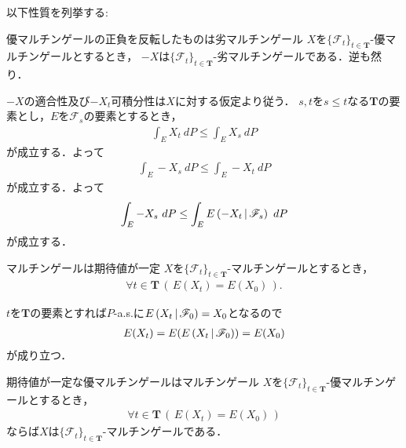 	以下性質を列挙する:
	\begin{itembox}[l]{優マルチンゲールの正負を反転したものは劣マルチンゲール}
		$X$を$\{\mathscr{F}_t\}_{t \in \mathbf{T}}$-優マルチンゲールとするとき，
		$-X$は$\{\mathscr{F}_t\}_{t \in \mathbf{T}}$-劣マルチンゲールである．逆も然り．
	\end{itembox}
	
	\begin{prf}
		$-X$の適合性及び$-X_t$可積分性は$X$に対する仮定より従う．
		$s,t$を$s \leq t$なる$\mathbf{T}$の要素とし，$E$を$\mathscr{F}_s$の要素とするとき，
		\begin{align}
			\int_E X_t\ dP \leq \int_E X_s\ dP
		\end{align}
		が成立する．よって
		\begin{align}
			\int_E -X_s\ dP \leq \int_E -X_t\ dP
		\end{align}
		が成立する．よって
		\begin{align}
			\int_E -X_s\ dP \leq \int_E E\left( -X_t \, \middle|\, \mathscr{F}_s \right)\ dP
		\end{align}
		が成立する．
		\QED
	\end{prf}
	
	\begin{itembox}[l]{マルチンゲールは期待値が一定}
		$X$を$\{\mathscr{F}_t\}_{t \in \mathbf{T}}$-マルチンゲールとするとき，
		\begin{align}
			\forall t \in \mathbf{T}\, (\, E(X_t) = E(X_0)\, ).
		\end{align}
	\end{itembox}
	
	\begin{prf}
		$t$を$\mathbf{T}$の要素とすれば$P$-a.s.に$E\left( X_t \, \middle|\, \mathscr{F}_0 \right) = X_0$となるので
		\begin{align}
			E(X_t) = E(E\left( X_t \, \middle|\, \mathscr{F}_0 \right)) = E(X_0)
		\end{align}
		が成り立つ．
		\QED
	\end{prf}
	
	\begin{itembox}[l]{期待値が一定な優マルチンゲールはマルチンゲール}
		$X$を$\{\mathscr{F}_t\}_{t \in \mathbf{T}}$-優マルチンゲールとするとき，
		\begin{align}
			\forall t \in \mathbf{T}\, (\, E(X_t) = E(X_0)\, )
		\end{align}
		ならば$X$は$\{\mathscr{F}_t\}_{t \in \mathbf{T}}$-マルチンゲールである．
	\end{itembox}
	
